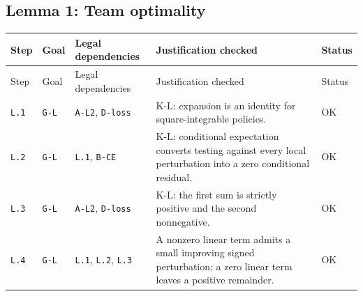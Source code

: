 \documentclass[11pt,letterpaper]{article}
\begin{document}
{\footnotesize \subsection{Lemma 1: Team optimality}
\begin{longtable}{>{\raggedright\arraybackslash}p{.10\linewidth}>{\raggedright\arraybackslash}p{.08\linewidth}>{\raggedright\arraybackslash}p{.19\linewidth}>{\raggedright\arraybackslash}p{.46\linewidth}>{\raggedright\arraybackslash}p{.08\linewidth}}
\toprule
Step & Goal & Legal dependencies & Justification checked & Status \\
\midrule\endfirsthead
\toprule
Step & Goal & Legal dependencies & Justification checked & Status \\
\midrule\endhead
\bottomrule\endfoot
\texttt{L.1} & \texttt{G-L} & \texttt{A-L2}, \texttt{D-loss} & K-L: expansion is an identity for square-integrable policies. & OK \\[3pt]
\texttt{L.2} & \texttt{G-L} & \texttt{L.1}, \texttt{B-CE} & K-L: conditional expectation converts testing against every local perturbation into a zero conditional residual. & OK \\[3pt]
\texttt{L.3} & \texttt{G-L} & \texttt{A-L2}, \texttt{D-loss} & K-L: the first sum is strictly positive and the second nonnegative. & OK \\*[3pt]
\texttt{L.4} & \texttt{G-L} & \texttt{L.1}, \texttt{L.2}, \texttt{L.3} & A nonzero linear term admits a small improving signed perturbation; a zero linear term leaves a positive remainder. & OK \\[3pt]
\end{longtable}
}
\end{document}
